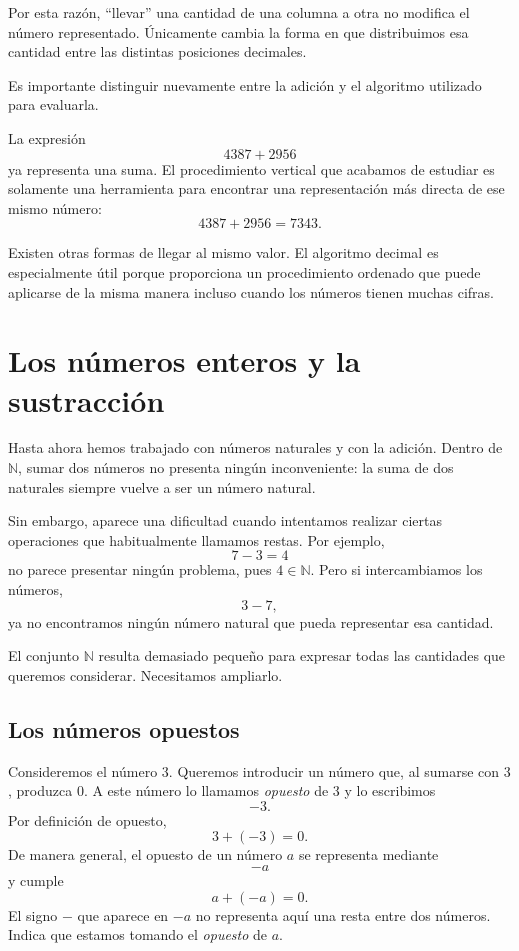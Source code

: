 Por esta razón, ``llevar'' una cantidad de una columna a otra no modifica el número representado. Únicamente cambia la forma en que distribuimos esa cantidad entre las distintas posiciones decimales.

\begin{note}
Es importante distinguir nuevamente entre la adición y el algoritmo utilizado para evaluarla.

La expresión
\[
4387+2956
\]
ya representa una suma. El procedimiento vertical que acabamos de estudiar es solamente una herramienta para encontrar una representación más directa de ese mismo número:
\[
4387+2956=7343.
\]

Existen otras formas de llegar al mismo valor. El algoritmo decimal es especialmente útil porque proporciona un procedimiento ordenado que puede aplicarse de la misma manera incluso cuando los números tienen muchas cifras.
\end{note}

\section{Los números enteros y la sustracción}

Hasta ahora hemos trabajado con números naturales y con la adición. Dentro de \(\mathbb{N}\), sumar dos números no presenta ningún inconveniente: la suma de dos naturales siempre vuelve a ser un número natural.

Sin embargo, aparece una dificultad cuando intentamos realizar ciertas operaciones que habitualmente llamamos restas. Por ejemplo,
\[
7-3=4
\]
no parece presentar ningún problema, pues \(4\in\mathbb{N}\). Pero si intercambiamos los números,
\[
3-7,
\]
ya no encontramos ningún número natural que pueda representar esa cantidad.

El conjunto \(\mathbb{N}\) resulta demasiado pequeño para expresar todas las cantidades que queremos considerar. Necesitamos ampliarlo.

\subsection{Los números opuestos}

Consideremos el número \(3\). Queremos introducir un número que, al sumarse con \(3\), produzca \(0\). A este número lo llamamos \emph{opuesto} de \(3\) y lo escribimos
\[
-3.
\]
Por definición de opuesto,
\[
3+(-3)=0.
\]
De manera general, el opuesto de un número \(a\) se representa mediante
\[
-a
\]
y cumple
\[
a+(-a)=0.
\]
El signo \(-\) que aparece en \(-a\) no representa aquí una resta entre dos números. Indica que estamos tomando el \emph{opuesto} de \(a\).

